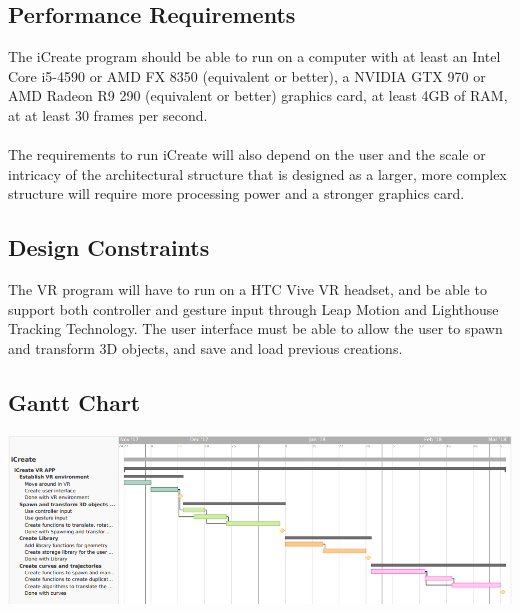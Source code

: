 \documentclass[letterpaper,draftclsnofoot,onecolumn,10 pt,compsoc]{IEEEtran}
\begin{document}
\subsection{Performance Requirements}
The iCreate program should be able to run on a computer with at least an Intel Core i5-4590 or AMD FX 8350 (equivalent or better), a NVIDIA GTX 970 or AMD Radeon R9 290 (equivalent or better) graphics card, at least 4GB of RAM, at at least 30 frames per second. 
\\ \\
The requirements to run iCreate will also depend on the user and the scale or intricacy of the architectural structure that is designed as a larger, more complex structure will require more processing power and a stronger graphics card.

\subsection{Design Constraints}
The VR program will have to run on a HTC Vive VR headset, and be able to support both controller and gesture input through Leap Motion and Lighthouse Tracking Technology. The user interface must be able to allow the user to spawn and transform 3D objects, and save and load previous creations.

\subsection{Gantt Chart}
\includegraphics[width=\textwidth]{Gantt_chart2.PNG}
\end{document}
